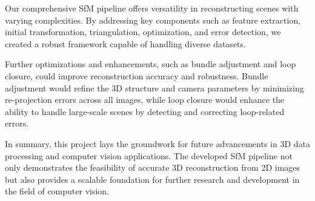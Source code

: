 \documentclass{article}
\begin{document}
Our comprehensive SfM pipeline offers versatility in reconstructing scenes with varying complexities. By addressing key components such as feature extraction, initial transformation, triangulation, optimization, and error detection, we created a robust framework capable of handling diverse datasets. 

Further optimizations and enhancements, such as bundle adjustment and loop closure, could improve reconstruction accuracy and robustness. Bundle adjustment would refine the 3D structure and camera parameters by minimizing re-projection errors across all images, while loop closure would enhance the ability to handle large-scale scenes by detecting and correcting loop-related errors.

In summary, this project lays the groundwork for future advancements in 3D data processing and computer vision applications. The developed SfM pipeline not only demonstrates the feasibility of accurate 3D reconstruction from 2D images but also provides a scalable foundation for further research and development in the field of computer vision.
\end{document}
